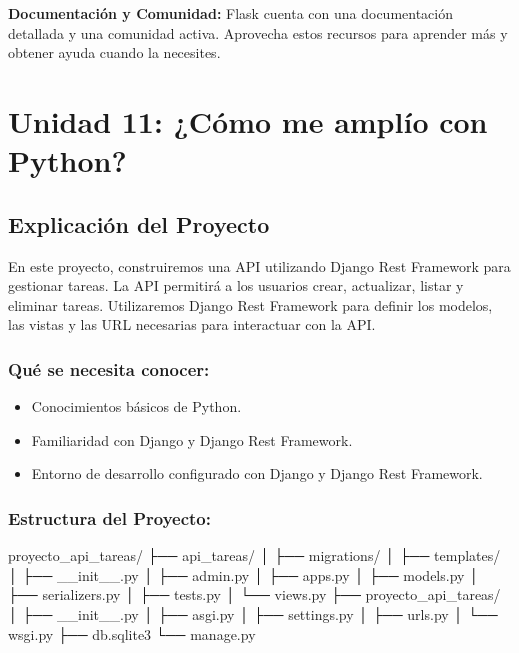 \documentclass[
  a4paper,
  DIV=11,
  numbers=noendperiod,
  onepage,
  openany]{scrreprt}
\newenvironment{Shaded}{\begin{snugshade}}{\end{snugshade}}
\newcommand{\NormalTok}[1]{\textcolor[rgb]{0.00,0.23,0.31}{#1}}
\providecommand{\tightlist}{%
  \setlength{\itemsep}{0pt}\setlength{\parskip}{0pt}}\usepackage{longtable,booktabs,array}
\begin{document}
\textbf{Documentación y Comunidad:} Flask cuenta con una documentación
detallada y una comunidad activa. Aprovecha estos recursos para aprender
más y obtener ayuda cuando la necesites.

\part{Unidad 11: ¿Cómo me amplío con Python?}

\chapter{Explicación del Proyecto}\label{explicaciuxf3n-del-proyecto}

En este proyecto, construiremos una API utilizando Django Rest Framework
para gestionar tareas. La API permitirá a los usuarios crear,
actualizar, listar y eliminar tareas. Utilizaremos Django Rest Framework
para definir los modelos, las vistas y las URL necesarias para
interactuar con la API.

\section{Qué se necesita conocer:}\label{quuxe9-se-necesita-conocer}

\begin{itemize}
\tightlist
\item
  Conocimientos básicos de Python.
\item
  Familiaridad con Django y Django Rest Framework.
\item
  Entorno de desarrollo configurado con Django y Django Rest Framework.
\end{itemize}

\section{Estructura del Proyecto:}\label{estructura-del-proyecto}

\begin{Shaded}
\begin{Highlighting}[]
\NormalTok{proyecto\_api\_tareas/}
\NormalTok{├── api\_tareas/}
\NormalTok{│   ├── migrations/}
\NormalTok{│   ├── templates/}
\NormalTok{│   ├── \_\_init\_\_.py}
\NormalTok{│   ├── admin.py}
\NormalTok{│   ├── apps.py}
\NormalTok{│   ├── models.py}
\NormalTok{│   ├── serializers.py}
\NormalTok{│   ├── tests.py}
\NormalTok{│   └── views.py}
\NormalTok{├── proyecto\_api\_tareas/}
\NormalTok{│   ├── \_\_init\_\_.py}
\NormalTok{│   ├── asgi.py}
\NormalTok{│   ├── settings.py}
\NormalTok{│   ├── urls.py}
\NormalTok{│   └── wsgi.py}
\NormalTok{├── db.sqlite3}
\NormalTok{└── manage.py}
\end{Highlighting}
\end{Shaded}
\end{document}
